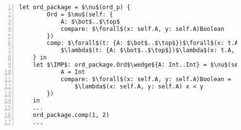 \begin{figure*}[h]
\begin{lstlisting}[mathescape,numbers=left]
    let ord_package = $\nu$(ord_p) {
        Ord = $\mu$(self: {
            A: $\bot$..$\top$
            compare: $\forall$(x: self.A, y: self.A)Boolean
        })
        comp: $\forall$(t: {A: $\bot$..$\top$})$\forall$(x: t.A, y: t.A)$\forall$$\IMP$(ev: ord_p.Ord$\wedge${A: $\bot$..$\top$})Boolean =
            $\lambda$(t: {A: $\bot$..$\top$})$\lambda$(x: t.A, y: t.A)$\IMP$.compare(x, y)
    } in
    let $\IMP$: ord_package.Ord$\wedge${A: Int..Int} = $\nu$(self: {
            A = Int
            compare: $\forall$(x: self.A, y: self.A)Boolean =
                $\lambda$(x: self.A, y: self.A) x < y
        })
    in
    ...
    ord_package.comp(1, 2)
    ...
\end{lstlisting}
\caption*{\textbf{Example 2.} The type class pattern in DIF}
\end{figure*}
